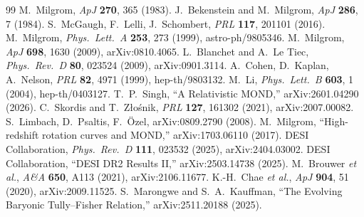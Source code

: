 \documentclass[11pt]{article}
\begin{document}
\begin{thebibliography}{99}
\small
{} M.\ Milgrom, \emph{ApJ} \textbf{270}, 365 (1983).
 J.\ Bekenstein and M.\ Milgrom, \emph{ApJ} \textbf{286}, 7 (1984).
 S.\ McGaugh, F.\ Lelli, J.\ Schombert, \emph{PRL} \textbf{117}, 201101 (2016).
 M.\ Milgrom, \emph{Phys.\ Lett.\ A} \textbf{253}, 273 (1999), astro-ph/9805346.
 M.\ Milgrom, \emph{ApJ} \textbf{698}, 1630 (2009), arXiv:0810.4065.
 L.\ Blanchet and A.\ Le Tiec, \emph{Phys.\ Rev.\ D} \textbf{80}, 023524 (2009),
arXiv:0901.3114.
 A.\ Cohen, D.\ Kaplan, A.\ Nelson, \emph{PRL} \textbf{82}, 4971 (1999), hep-th/9803132.
 M.\ Li, \emph{Phys.\ Lett.\ B} \textbf{603}, 1 (2004), hep-th/0403127.
 T.\ P.\ Singh, ``A Relativistic MOND,'' arXiv:2601.04290 (2026).
 C.\ Skordis and T.\ Z\l{}o\'snik, \emph{PRL} \textbf{127}, 161302 (2021),
arXiv:2007.00082.
 S.\ Limbach, D.\ Psaltis, F.\ \"Ozel, arXiv:0809.2790 (2008).
 M.\ Milgrom, ``High-redshift rotation curves and MOND,'' arXiv:1703.06110 (2017).
 DESI Collaboration, \emph{Phys.\ Rev.\ D} \textbf{111}, 023532 (2025), arXiv:2404.03002.
 DESI Collaboration, ``DESI DR2 Results II,'' arXiv:2503.14738 (2025).
 M.\ Brouwer \emph{et al.}, \emph{A\&A} \textbf{650}, A113 (2021), arXiv:2106.11677.
 K.-H.\ Chae \emph{et al.}, \emph{ApJ} \textbf{904}, 51 (2020), arXiv:2009.11525.
 S.\ Marongwe and S.\ A.\ Kauffman, ``The Evolving Baryonic Tully--Fisher Relation,''
arXiv:2511.20188 (2025).
\end{thebibliography}
\end{document}
